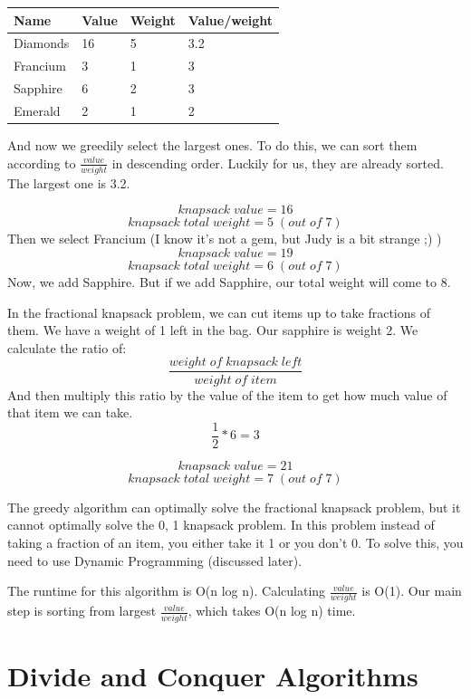 \documentclass{article}
\begin{document}
\begin{center}
\begin{tabular}{|l|l|l|l|}
\hline
\centering
\textbf{Name} & \textbf{Value} & \textbf{Weight} & \textbf{Value/weight} \\ \hline
Diamonds      & 16             & 5 & 3.2              \\ \hline
Francium      & 3              & 1    & 3           \\ \hline
Sapphire      & 6              & 2       & 3        \\ \hline
Emerald       & 2              & 1       & 2        \\ \hline
\end{tabular}
\end{center}
And now we greedily select the largest ones. To do this, we can sort them according to $\frac{value}{weight}$ in descending order. Luckily for us, they are already sorted. The largest one is 3.2. 


$$knapsack \;value = 16$$
$$knapsack \;total \;weight = 5 \;(out \;of \;7)$$
Then we select Francium (I know it's not a gem, but Judy is a bit strange ;) )
$$knapsack \;value = 19$$
$$knapsack \;total \;weight = 6 \;(out \;of \;7)$$
Now, we add Sapphire. But if we add Sapphire, our total weight will come to 8. 

In the fractional knapsack problem, we can cut items up to take fractions of them. We have a weight of 1 left in the bag. Our sapphire is weight 2. We calculate the ratio of:
$$\frac{weight\;of\;knapsack\;left}{weight\;of\;item}$$
And then multiply this ratio by the value of the item to get how much value of that item we can take.
$$\frac{1}{2} * 6 = 3$$

$$knapsack \;value = 21$$
$$knapsack \;total \;weight = 7 \;(out \;of \;7)$$

The greedy algorithm can optimally solve the fractional knapsack problem, but it cannot optimally solve the {0, 1} knapsack problem. In this problem instead of taking a fraction of an item, you either take it {1} or you don't {0}. To solve this, you need to use Dynamic Programming (discussed later).

The runtime for this algorithm is O(n log n). Calculating $\frac{value}{weight}$ is O(1). Our main step is sorting from largest $\frac{value}{weight}$, which takes O(n log n) time.
\newpage
\section{Divide and Conquer Algorithms}
\end{document}
